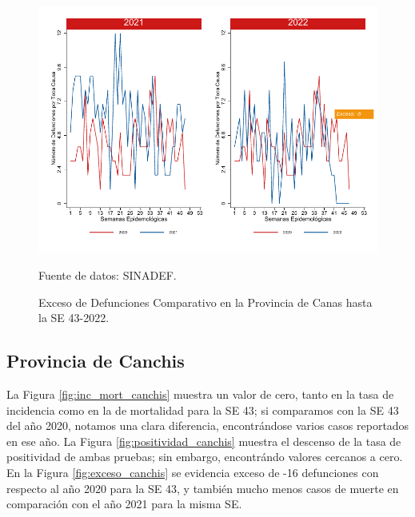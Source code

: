 \documentclass[12pt,a4paper,openany]{book}
\begin{document}
	\begin{figure}[h]
		\caption{Exceso de Defunciones Comparativo en la Provincia de Canas hasta la SE 43-2022.}\label{fig:exceso_canas}
		\begin{center}
			\includegraphics[width=0.7\linewidth]{../figuras/exceso_4.pdf}
		\end{center}
		{\footnotesize {Fuente de datos: SINADEF.}}
	\end{figure}
	
	\clearpage
	
	\subsection*{Provincia de Canchis}
	\noindent La Figura \ref{fig:inc_mort_canchis} muestra un valor de cero, tanto en la tasa de incidencia como en la de mortalidad para la SE 43;  si comparamos con la SE 43 del año 2020, notamos una clara diferencia, encontrándose varios casos reportados en ese año.
	\noindent La Figura \ref{fig:positividad_canchis} muestra el descenso de la tasa de positividad de ambas pruebas; sin embargo, encontrándo valores cercanos a cero. 
	En la Figura \ref{fig:exceso_canchis} se evidencia exceso de -16 defunciones con respecto al año 2020 para la SE 43, y también mucho menos casos de muerte en comparación con el año 2021 para la misma SE.
	
\end{document}

